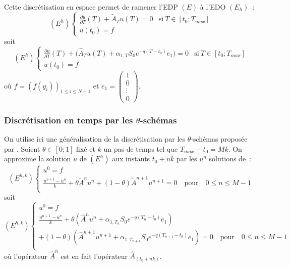 Cette discr\'etisation en espace permet de ramener l'EDP $(E)$ 
\`a l'EDO $(E_h)$~:
$$
(E^h)
\left \{
\begin{array}{ll}
{\displaystyle \frac{\partial u}{\partial T}(T) + 
\tilde{A}_Tu(T) = 0} & \text{si}~ T \in [t_0;T_{max}]\\
u(t_0) = f &
\end{array}
\right .
$$
soit
$$
(E^h)
\left \{
\begin{array}{ll}
{\displaystyle \frac{\partial u}{\partial T}(T) + 
\biggl(\hat{A}_Tu(T) + \alpha_{1,T}S_0e^{-q(T-t_0)}e_1\biggr) = 0} & 
\text{si}~ T \in [t_0;T_{max}]\\
u(t_0) = f &
\end{array}
\right .
$$
o\`u $f = (f(y_i))_{1\leq i\leq N-1}$ et 
$e_1 = \begin{pmatrix} 1\\0\\\vdots\\0\end{pmatrix}$. 

\subsubsection{Discr\'etisation en temps par les $\theta$-sch\'emas}

On utilise ici une g\'en\'eralisation de la discr\'etisation par les 
$\theta$-sch\'emas propos\'ee par \cite{lamb:ell:91}. Soient 
$\theta \in [0;1]$ fix\'e et $k$ un pas de temps tel que 
$T_{max}-t_0=Mk$. On approxime la solution $u$ de $(E^h)$ aux 
instants $t_0+nk$ par les $u^n$ solutions de~:
$$
(E^{h,k})
\left \{
\begin{array}{l}
u^0 = f \\
{\displaystyle \frac{u^{n+1}-u^n}{k} + 
\theta\tilde{A}^n u^n +(1-\theta)\tilde{A}^{n+1}u^{n+1}= 0
\quad\text{pour}\quad  0\leq n\leq M-1}\\
\end{array}
\right .
$$
soit
$$
(E^{h,k})
\left \{
\begin{array}{l}
u^0 = f  \\
{\displaystyle\frac{u^{n+1}-u^n}{k} + \theta(\hat{A}^n u^n + 
\alpha_{1,T_n}S_0e^{-q(T_n-t_0)}e_1)} \\
{\displaystyle +(1-\theta)(\hat{A}^{n+1}u^{n+1} + 
\alpha_{1,T_{n+1}}S_0e^{-q(T_{n+1}-t_0)}e_1)= 0
\quad\text{pour}\quad  0\leq n\leq M-1}\\
\end{array}
\right .
$$
o\`u l'op\'erateur $\hat{A}^n$ est en fait l'op\'erateur 
$\hat{A}_{(t_0+nk)}$. 

